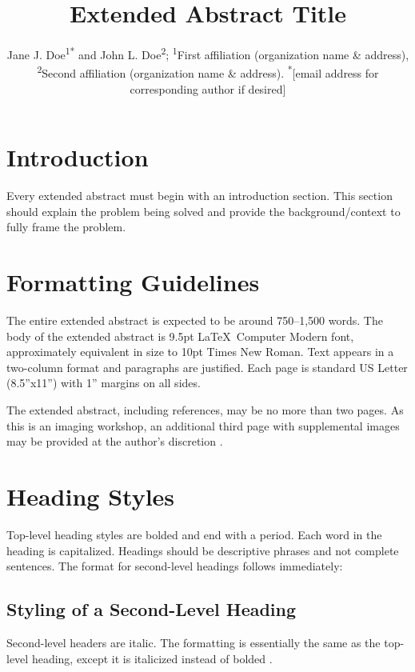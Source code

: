 \documentclass{SIW}
\author{
	Jane J. Doe\textsuperscript{1}\textsuperscript{*}
	and 
	John L. Doe\textsuperscript{2};
	\textsuperscript{1}First affiliation (organization name \& address),
	\textsuperscript{2}Second affiliation (organization name \& address).
	\textsuperscript{*}[email address for corresponding author if desired]
}
\title{Extended Abstract Title}
\begin{document}
\maketitle


\section*{Introduction}
Every extended abstract must begin with an introduction section. This section should explain the problem being solved and provide the background/context to fully frame the problem.

\section*{Formatting Guidelines}
The entire extended abstract is expected to be around 750--1,500 words.  The body of the extended abstract is 9.5pt \LaTeX\ Computer Modern font, approximately equivalent in size to 10pt Times New Roman. Text appears in a two-column format and paragraphs are justified. Each page is standard US Letter (8.5''x11'') with 1'' margins on all sides.

The extended abstract, including references, may be no more than two pages. As this is an imaging workshop, an additional third page with supplemental images may be provided at the author’s discretion \cite{christian2012}.

\section*{Heading Styles}
Top-level heading styles are bolded and end with a period. Each word in the heading is capitalized. Headings should be descriptive phrases and not complete sentences. The format for second-level headings follows immediately:

\subsection*{Styling of a Second-Level Heading}
Second-level headers are italic. The formatting is essentially the same as the top-level heading, except it is italicized instead of bolded \cite{owen2008}.
\end{document}
